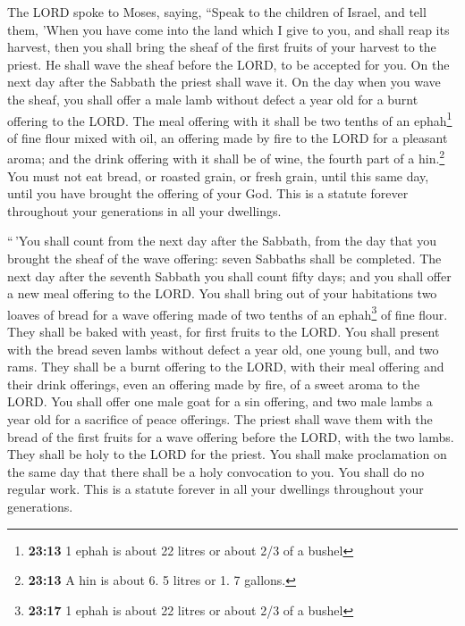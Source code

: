  The LORD spoke to Moses, saying,  ``Speak
to the children of Israel, and tell them, 'When you have come into the
land which I give to you, and shall reap its harvest, then you shall
bring the sheaf of the first fruits of your harvest to the priest.
 He shall wave the sheaf before the LORD, to be accepted
for you. On the next day after the Sabbath the priest shall wave it.
 On the day when you wave the sheaf, you shall offer a
male lamb without defect a year old for a burnt offering to the LORD.
 The meal offering with it shall be two tenths of an
ephah\footnote{\textbf{23:13} 1 ephah is about 22 litres or about 2/3 of
  a bushel} of fine flour mixed with oil, an offering made by fire to
the LORD for a pleasant aroma; and the drink offering with it shall be
of wine, the fourth part of a hin.\footnote{\textbf{23:13} A hin is
  about 6. 5 litres or 1. 7 gallons.}  You must not eat
bread, or roasted grain, or fresh grain, until this same day, until you
have brought the offering of your God. This is a statute forever
throughout your generations in all your dwellings.

 ``\,'You shall count from the next day after the
Sabbath, from the day that you brought the sheaf of the wave offering:
seven Sabbaths shall be completed.  The next day after
the seventh Sabbath you shall count fifty days; and you shall offer a
new meal offering to the LORD.  You shall bring out of
your habitations two loaves of bread for a wave offering made of two
tenths of an ephah\footnote{\textbf{23:17} 1 ephah is about 22 litres or
  about 2/3 of a bushel} of fine flour. They shall be baked with yeast,
for first fruits to the LORD.  You shall present with the
bread seven lambs without defect a year old, one young bull, and two
rams. They shall be a burnt offering to the LORD, with their meal
offering and their drink offerings, even an offering made by fire, of a
sweet aroma to the LORD.  You shall offer one male goat
for a sin offering, and two male lambs a year old for a sacrifice of
peace offerings.  The priest shall wave them with the
bread of the first fruits for a wave offering before the LORD, with the
two lambs. They shall be holy to the LORD for the priest.
 You shall make proclamation on the same day that there
shall be a holy convocation to you. You shall do no regular work. This
is a statute forever in all your dwellings throughout your generations.


